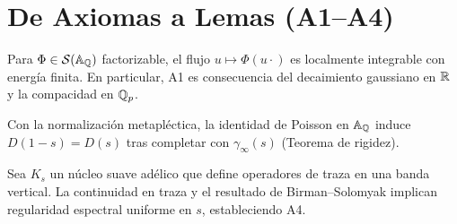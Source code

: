 \section{De Axiomas a Lemas (A1--A4)}

\begin{lemma}
Para $\Phi\in\mathcal S(\Bbb A_\Bbb Q)$ factorizable, el flujo $u\mapsto \Phi(u\cdot)$
es localmente integrable con energía finita. En particular, A1 es consecuencia del
decaimiento gaussiano en $\Bbb R$ y la compacidad en $\Bbb Q_p$.
\end{lemma}

\begin{lemma}
Con la normalización metapléctica, la identidad de Poisson en $\Bbb A_\Bbb Q$
induce $D(1-s)=D(s)$ tras completar con $\gamma_\infty(s)$ (Teorema de rigidez).
\end{lemma}

\begin{lemma}
Sea $K_s$ un núcleo suave adélico que define operadores de traza en una banda vertical.
La continuidad en traza y el resultado de Birman--Solomyak implican regularidad
espectral uniforme en $s$, estableciendo A4.
\end{lemma}
